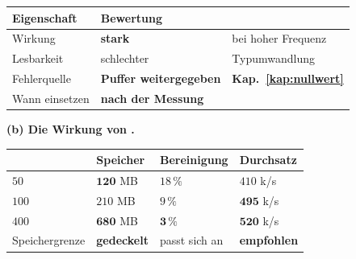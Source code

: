 \begin{aufgabe}
\begin{center}
\renewcommand{\arraystretch}{1.45}
\begin{tabular}{@{}P{3.0cm}P{2.2cm}P{2.8cm}@{}}
\toprule
\textbf{Eigenschaft} & \textbf{Bewertung} & \\
\midrule
Wirkung & \textcolor{gruen}{\textbf{stark}} & bei hoher Frequenz\\
Lesbarkeit & \textcolor{akzent}{schlechter} & \textcolor{akzent}{Typum\-wandlung}\\
Fehlerquelle & \textcolor{akzent}{\textbf{Puffer weitergegeben}} & \textcolor{akzent}{\textbf{Kap.~\ref{kap:nullwert}}}\\
Wann einsetzen & \textcolor{mittel}{\textbf{nach der Messung}} & \\
\bottomrule
\end{tabular}
\end{center}

\begin{center}
\end{center}

\medskip
\textbf{(b) Die Wirkung von .}

\begin{center}
\renewcommand{\arraystretch}{1.45}
\begin{tabular}{@{}P{2.6cm}P{2.0cm}P{2.2cm}P{2.0cm}@{}}
\toprule
{} & \textbf{Speicher} & \textbf{Bereini\-gung} & \textbf{Durch\-satz}\\
\midrule
$50$ & \textcolor{gruen}{$\mathbf{120}$ MB} & \textcolor{akzent}{$18\,\%$} & $410$ k/s\\
$100$ & $210$ MB & $9\,\%$ & $\mathbf{495}$ k/s\\
$400$ & $\mathbf{680}$ MB & \textcolor{gruen}{$\mathbf{3\,\%}$} & $\mathbf{520}$ k/s\\
Speichergrenze & \textcolor{gruen}{\textbf{gedeckelt}} & \textcolor{gruen}{passt sich an} & \textcolor{gruen}{\textbf{empfohlen}}\\
\bottomrule
\end{tabular}
\end{center}

\begin{center}
\begin{minipage}{0.88\textwidth}
\end{minipage}
\end{center}


\end{aufgabe}
